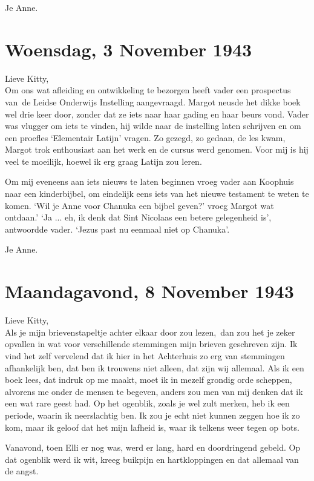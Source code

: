 \documentclass{book}
\begin{document}
Je Anne.

\section*{Woensdag, 3 November 1943}

Lieve Kitty,\\
Om ons wat afleiding en ontwikkeling te bezorgen heeft vader een
prospectus van~de Leidse Onderwijs Instelling aangevraagd.  Margot neusde het
dikke boek wel drie keer door, zonder dat ze iets naar haar gading en haar beurs
vond. Vader was vlugger om iets te vinden, hij wilde naar de instelling laten
schrijven en om een proefles `Elementair Latijn' vragen. Zo gezegd, zo gedaan,
de les kwam, Margot trok enthousiast aan het werk en de cursus werd genomen.
Voor mij is hij veel te moeilijk, hoewel ik erg graag Latijn zou leren.

Om mij eveneens aan iets nieuws te laten beginnen vroeg vader aan Koophuis naar
een kinderbijbel, om eindelijk eens iets van het nieuwe testament te weten te
komen. `Wil je Anne voor Chanuka een bijbel geven?' vroeg Margot wat ontdaan.'
`Ja ... eh, ik denk dat Sint Nicolaas een betere gelegenheid is', antwoordde
vader. `Jezus past nu eenmaal niet op Chanuka'.

Je Anne.

\section*{Maandagavond, 8 November 1943}

Lieve Kitty,\\
Als je mijn brievenstapeltje achter elkaar door zou lezen,~dan
zou het je zeker opvallen in wat voor verschillende stemmingen mijn brieven
geschreven zijn. Ik vind het zelf vervelend dat ik hier in het Achterhuis zo erg
van stemmingen afhankelijk ben, dat ben ik trouwens niet alleen, dat zijn wij
allemaal. Als ik een boek lees, dat indruk op me maakt, moet ik in mezelf
grondig orde scheppen, alvorens me onder de mensen te begeven, anders zou men
van mij denken dat ik een wat rare geest had. Op het ogenblik, zoals je wel zult
merken, heb ik een periode, waarin ik neerslachtig ben. Ik zou je echt niet
kunnen zeggen hoe ik zo kom, maar ik geloof dat het mijn lafheid is, waar ik
telkens weer tegen op bots.

Vanavond, toen Elli er nog was, werd er lang, hard en doordringend gebeld. Op
dat ogenblik werd ik wit, kreeg buikpijn en hartkloppingen en dat allemaal van
de angst.
\end{document}
